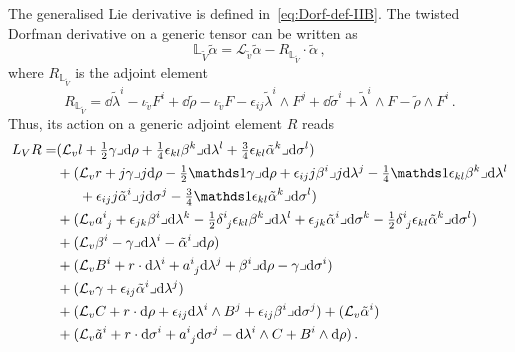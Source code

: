 \documentclass[debug]{phd}
\begin{document}
			The generalised Lie derivative is defined in~\eqref{eq:Dorf-def-IIB}. 
			The twisted Dorfman derivative on a generic tensor can be written as
					\begin{equation}\label{eq:twisted_untwisted_lie_der}
							\mathbb{L}_{\tilde V} \tilde{\alpha} = \mathcal{L}_{\tilde v} \tilde{\alpha} - R_{\mathbb{L}_{\tilde V}} \cdot \tilde{\alpha}\, ,
					\end{equation}
			where $R_{\mathbb{L}_{\tilde V}}$ is the adjoint element 
					\begin{equation}\label{eq:tensor_r}
						R_{\mathbb{L}_{\tilde V}} = \dd \tilde{\lambda}^i -\iota_{\tilde v} F^i + \dd \tilde{\rho} - \iota_{\tilde v} F - \epsilon_{ij} \tilde{\lambda}^i \wedge F^j + \dd \tilde{\sigma}^i +\tilde{\lambda}^i \wedge F - \tilde{\rho} \wedge F^i \, . 
					\end{equation}
			Thus, its action on a generic adjoint element $R$ reads
					\begin{equation}\label{eq:IIB_Dorf_adjoint}
						\begin{split}
							L_{V}R = & (\mathcal{L}_{v} l + \tfrac{1}{2}\gamma\lrcorner \dd\rho + \tfrac{1}{4}\epsilon_{kl}\beta^{k}\lrcorner\dd\lambda^{l}+\tfrac{3}{4}\epsilon_{kl}\tilde{\alpha}^{k}\lrcorner\dd\sigma^{l})\\
 								& +(\mathcal{L}_{v}r+j\gamma\lrcorner j\dd\rho-\tfrac{1}{2}\id\gamma\lrcorner\dd\rho+\epsilon_{ij}j\beta^{i}\lrcorner j\dd\lambda^{j}-\tfrac{1}{4}\id\epsilon_{kl}\beta^{k}\lrcorner\dd\lambda^{l}\\
								& \phantom{{}+({}}+\epsilon_{ij}j\tilde{\alpha}^{i}\lrcorner j\dd\sigma^{j}-\tfrac{3}{4}\id\epsilon_{kl}\tilde{\alpha}^{k}\lrcorner\dd\sigma^{l})\\
 								& +(\mathcal{L}_{v}a_{\phantom{i}j}^{i}+\epsilon_{jk}\beta^{i}\lrcorner\dd\lambda^{k}-\tfrac{1}{2}\delta_{\phantom{i}j}^{i}\epsilon_{kl}\beta^{k}\lrcorner\dd\lambda^{l}+\epsilon_{jk}\tilde{\alpha}^{i}\lrcorner\dd\sigma^{k}-\tfrac{1}{2}\delta_{\phantom{i}j}^{i}\epsilon_{kl}\tilde{\alpha}^{k}\lrcorner\dd\sigma^{l})\\
 								& +(\mathcal{L}_{v}\beta^{i}-\gamma\lrcorner\dd\lambda^{i}-\tilde{\alpha}^{i}\lrcorner\dd\rho)\\
 								& +(\mathcal{L}_{v}B^{i}+r\cdot\dd\lambda^{i}+a_{\phantom{i}j}^{i}\dd\lambda^{j}+\beta^{i}\lrcorner\dd\rho-\gamma\lrcorner\dd\sigma^{i})\\
 								& +(\mathcal{L}_{v}\gamma+\epsilon_{ij}\tilde{\alpha}^{i}\lrcorner\dd\lambda^{j})\\
 								& +(\mathcal{L}_{v}C+r\cdot\dd\rho+\epsilon_{ij}\dd\lambda^{i}\wedge B^{j}+\epsilon_{ij}\beta^{i}\lrcorner\dd\sigma^{j})+(\mathcal{L}_{v}\tilde{\alpha}^{i})\\
 								& +(\mathcal{L}_{v}\tilde{a}^{i}+r\cdot\dd\sigma^{i}+a_{\phantom{i}j}^{i}\dd\sigma^{j}-\dd\lambda^{i}\wedge C+B^{i}\wedge\dd\rho)\, .
						\end{split}
					\end{equation}
			
\end{document}
